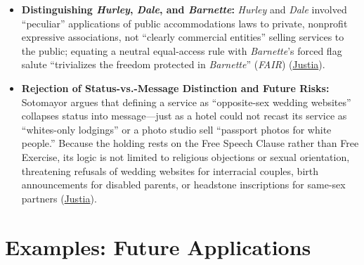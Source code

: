 \documentclass[12pt]{article}
\begin{document}
\begin{itemize}
  \item \textbf{Distinguishing \textit{Hurley}, \textit{Dale}, and \textit{Barnette}:} \textit{Hurley} and \textit{Dale} involved ``peculiar'' applications of public accommodations laws to private, nonprofit expressive associations, not ``clearly commercial entities'' selling services to the public; equating a neutral equal-access rule with \textit{Barnette}'s forced flag salute ``trivializes the freedom protected in \textit{Barnette}'' (\textit{FAIR}) (\href{https://supreme.justia.com/cases/federal/us/600/21-476/}{Justia}).
  \item \textbf{Rejection of Status-vs.-Message Distinction and Future Risks:} Sotomayor argues that defining a service as ``opposite-sex wedding websites'' collapses status into message---just as a hotel could not recast its service as ``whites-only lodgings'' or a photo studio sell ``passport photos for white people.'' Because the holding rests on the Free Speech Clause rather than Free Exercise, its logic is not limited to religious objections or sexual orientation, threatening refusals of wedding websites for interracial couples, birth announcements for disabled parents, or headstone inscriptions for same-sex partners (\href{https://supreme.justia.com/cases/federal/us/600/21-476/}{Justia}).
\end{itemize}

\section{Examples: Future Applications}
\end{document}
